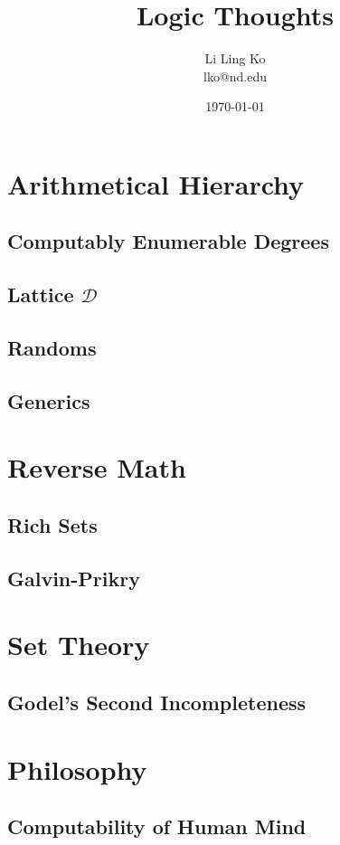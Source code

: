 \documentclass{article}
\begin{document}
\title{Logic Thoughts}
\author{Li Ling Ko\\ lko@nd.edu}
\date{\today}
\maketitle

\section{Arithmetical Hierarchy}
  \subsection{Computably Enumerable Degrees}
    

  \subsection{Lattice $\mathcal{D}$}
    

  \subsection{Randoms}
    

  \subsection{Generics}
    

\section{Reverse Math}
  \subsection{Rich Sets}
    

  \subsection{Galvin-Prikry}
    

\section{Set Theory}
  \subsection{Godel's Second Incompleteness}
    

\section{Philosophy}
  \subsection{Computability of Human Mind}
    
\end{document}

